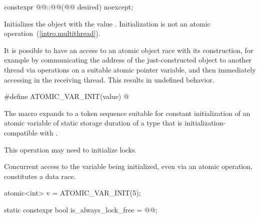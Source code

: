%
%
%
\begin{itemdecl}
constexpr @@::@@(@@ desired) noexcept;
\end{itemdecl}

\begin{itemdescr}
\pnum
\effects Initializes the object with the value .
Initialization is not an atomic operation~(\ref{intro.multithread}).
\begin{note} It is possible to have an access to an atomic object 
race with its construction, for example by communicating the address of the
just-constructed object  to another thread via
 operations on a suitable atomic pointer
variable, and then immediately accessing  in the receiving thread.
This results in undefined behavior. \end{note}
\end{itemdescr}

%
\begin{itemdecl}
#define ATOMIC_VAR_INIT(value) @\seebelow@
\end{itemdecl}

\begin{itemdescr}
\pnum
The macro expands to a token sequence suitable for
constant initialization of
an atomic variable of static storage duration of a type that is
initialization-compatible with .
\begin{note} This operation may need to initialize locks. \end{note}
Concurrent access to the variable being initialized, even via an atomic operation,
constitutes a data race. \begin{example}
\begin{codeblock}
atomic<int> v = ATOMIC_VAR_INIT(5);
\end{codeblock}
\end{example}
\end{itemdescr}

%
%
%
\begin{itemdecl}
static constexpr bool is_always_lock_free = @@;
\end{itemdecl}

